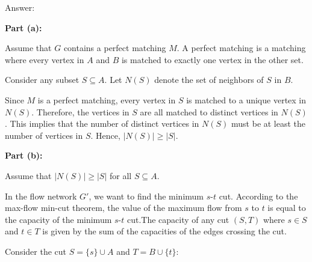 \documentclass{oxmathproblems}
\begin{document}
\begin{questions}

Answer:

\textbf{Part (a):}

Assume that \( G \) contains a perfect matching \( M \). A perfect matching is a matching where every vertex in \( A \) and \( B \) is matched to exactly one vertex in the other set. 

Consider any subset \( S \subseteq A \). Let \( N(S) \) denote the set of neighbors of \( S \) in \( B \). 

Since \( M \) is a perfect matching, every vertex in \( S \) is matched to a unique vertex in \( N(S) \). Therefore, the vertices in \( S \) are all matched to distinct vertices in \( N(S) \). 
\newpage
This implies that the number of distinct vertices in \( N(S) \) must be at least the number of vertices in \( S \). Hence, \( |N(S)| \geq |S| \).

\textbf{Part (b):}

Assume that \( |N(S)| \geq |S| \) for all \( S \subseteq A \).

In the flow network \( G' \), we want to find the minimum \( s \)-\( t \) cut. According to the max-flow min-cut theorem, the value of the maximum flow from \( s \) to \( t \) is equal to the capacity of the minimum \( s \)-\( t \) cut.The capacity of any cut \( (S, T) \) where \( s \in S \) and \( t \in T \) is given by the sum of the capacities of the edges crossing the cut.

Consider the cut \( S = \{s\} \cup A \) and \( T = B \cup \{t\} \):


\end{questions}
\end{document}

